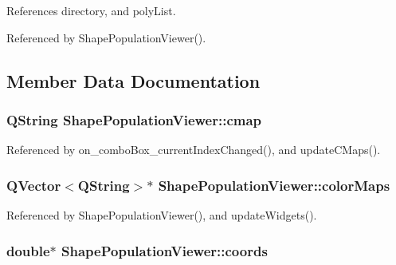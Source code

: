 References directory, and poly\-List.



Referenced by Shape\-Population\-Viewer().



\subsection{Member Data Documentation}
\hypertarget{class_shape_population_viewer_a69f478eade0bf23b94037e5a09dfc127}{
\subsubsection[{cmap}]{\setlength{\rightskip}{0pt plus 5cm}Q\-String Shape\-Population\-Viewer\-::cmap\hspace{0.3cm}{\ttfamily [protected]}}}\label{class_shape_population_viewer_a69f478eade0bf23b94037e5a09dfc127}


Referenced by on\-\_\-combo\-Box\-\_\-current\-Index\-Changed(), and update\-C\-Maps().

\hypertarget{class_shape_population_viewer_aefdd9f2ac19f0e0cd7bdfeb2a94dbcf3}{
\subsubsection[{color\-Maps}]{\setlength{\rightskip}{0pt plus 5cm}Q\-Vector$<$Q\-String$>$$\ast$ Shape\-Population\-Viewer\-::color\-Maps\hspace{0.3cm}{\ttfamily [protected]}}}\label{class_shape_population_viewer_aefdd9f2ac19f0e0cd7bdfeb2a94dbcf3}


Referenced by Shape\-Population\-Viewer(), and update\-Widgets().

\hypertarget{class_shape_population_viewer_aaf35bd7b070b3cef6fa85cd1f07f5ab0}{
\subsubsection[{coords}]{\setlength{\rightskip}{0pt plus 5cm}double$\ast$ Shape\-Population\-Viewer\-::coords\hspace{0.3cm}{\ttfamily [protected]}}}\label{class_shape_population_viewer_aaf35bd7b070b3cef6fa85cd1f07f5ab0}


